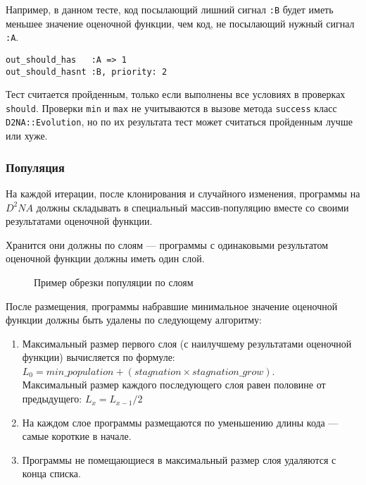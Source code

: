 \documentclass[utf8,a5paper,portrait,10pt,twoside]{eskdtext}
\begin{document}
Например, в данном тесте, код посылающий лишний сигнал \texttt{:B} будет иметь
меньшее значение оценочной функции, чем код, не посылающий нужный сигнал
\texttt{:A}.

\begin{verbatim}
out_should_has   :A => 1
out_should_hasnt :B, priority: 2
\end{verbatim}

Тест считается пройденным, только если выполнены все условиях в проверках
\texttt{should}. Проверки \texttt{min} и \texttt{max} не учитываются в вызове
метода \texttt{success} класс \texttt{D2NA::Evolution}, но по их результата
тест может считаться пройденным лучше или хуже.

\newpage
\subsubsection{Популяция}

На каждой итерации, после клонирования и случайного изменения, программы на
$D^2NA$ должны складывать в специальный массив-популяцию вместе со своими
результатами оценочной функции.

Хранится они должны по слоям — программы с одинаковыми результатом оценочной
функции должны иметь один слой.


\begin{figure}
  \centering
  
  \caption{Пример обрезки популяции по слоям}
\end{figure}

После размещения, программы набравшие минимальное значение оценочной функции
должны быть удалены по следующему алгоритму:

\begin{enumerate}
  \item Максимальный размер первого слоя (с наилучшему результатами оценочной
        функции) вычисляется по формуле:\\
        $L_0 = min\_population + (stagnation \times stagnation\_grow)$.\\
        Максимальный размер каждого последующего слоя равен половине от
        предыдущего: $L_{x} = L_{x-1} / 2$
  \item На каждом слое программы размещаются по уменьшению длины кода — самые
        короткие в начале.
  \item Программы не помещающиеся в максимальный размер слоя удаляются с конца
        списка.
\end{enumerate}
\end{document}
